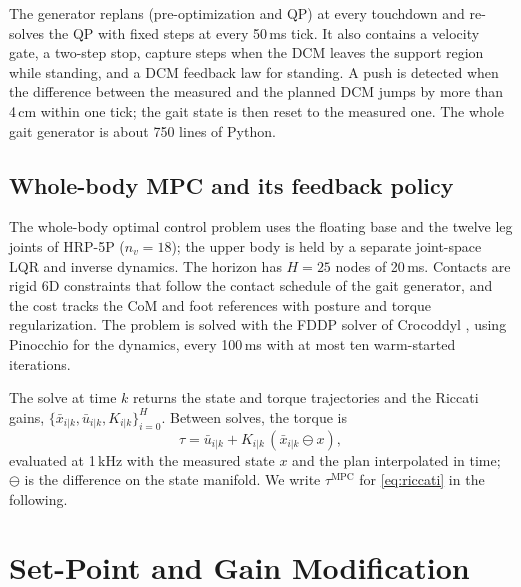 \documentclass[conference]{IEEEtran}
\newcommand{\mpc}{\mathrm{MPC}}
\newcommand{\xb}{\bar{x}}
\newcommand{\ub}{\bar{u}}
\begin{document}
The generator replans (pre-optimization and QP) at every touchdown and re-solves the QP with fixed steps at every 50\,ms tick.
It also contains a velocity gate, a two-step stop, capture steps when the DCM leaves the support region while standing, and a DCM feedback law for standing.
A push is detected when the difference between the measured and the planned DCM jumps by more than 4\,cm within one tick; the gait state is then reset to the measured one.
The whole gait generator is about 750 lines of Python.

\subsection{Whole-body MPC and its feedback policy}
\label{sec:wb}
The whole-body optimal control problem uses the floating base and the twelve leg joints of HRP-5P ($n_v=18$); the upper body is held by a separate joint-space LQR and inverse dynamics.
The horizon has $H=25$ nodes of 20\,ms.
Contacts are rigid 6D constraints that follow the contact schedule of the gait generator, and the cost tracks the CoM and foot references with posture and torque regularization.
The problem is solved with the FDDP solver of Crocoddyl \cite{mastalli2020crocoddyl}, using Pinocchio \cite{carpentier2019pinocchio} for the dynamics, every 100\,ms with at most ten warm-started iterations.

The solve at time $k$ returns the state and torque trajectories and the Riccati gains, $\{\xb_{i|k},\ub_{i|k},K_{i|k}\}_{i=0}^{H}$.
Between solves, the torque is
\begin{equation}
\tau=\ub_{i|k}+K_{i|k}\,(\xb_{i|k}\ominus x),
\label{eq:riccati}
\end{equation}
evaluated at 1\,kHz with the measured state $x$ and the plan interpolated in time; $\ominus$ is the difference on the state manifold.
We write $\tau^{\mpc}$ for \eqref{eq:riccati} in the following.


\section{Set-Point and Gain Modification}
\label{sec:method}
\end{document}
